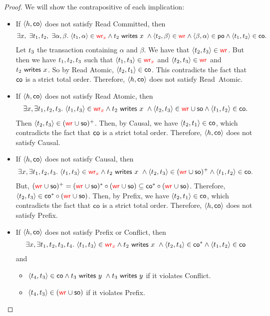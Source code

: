 \begin{proof}
  We will show the contrapositive of each implication:
 \begin{itemize}
   \item If $\tup{\hist, \co}$ does not satisfy \textsf{Read Committed},  then
\begin{align*}
\exists \xvar,\ \exists \tr_1,\tr_2,\ \exists \alpha,\beta.\ \tup{\tr_1,\alpha}\in \wro[\xvar] \land \writeVar{\tr_2}{\xvar}\ \land \tup{\tr_2,\beta}\in\wro \land \tup{\beta,\alpha} \in \po \land \tup{\tr_1,\tr_2}\in\co. 
\end{align*}
Let $\tr_3$ the transaction containing $\alpha$ and $\beta$. We have that $\tup{\tr_2, \tr_3} \in \wro$. But then we have $\tr_1, \tr_2, \tr_3$ such that $\tup{\tr_1, \tr_3} \in \wro[\xvar]$ and $\tup{\tr_2, \tr_3} \in \wro$ and $\writeVar{\tr_2}{\xvar}$. So by \textsf{Read Atomic}, $\tup{\tr_2, \tr_1} \in \co$. This contradicts the fact that $\co$ is a strict total order. Therefore, $\tup{\hist, \co}$ does not satisfy \textsf{Read\ Atomic}.
   \item If $\tup{\hist, \co}$ does not satisfy \textsf{Read Atomic}, then 
 \begin{align*}  
 \exists \xvar, \exists \tr_1,\tr_2,\tr_3.\ \tup{\tr_1,\tr_3}\in \wro[\xvar] \land \writeVar{\tr_2}{\xvar}\ \land \tup{\tr_2,\tr_3}\in\wro\cup\so \land \tup{\tr_1,\tr_2}\in\co.
 \end{align*}
  Then $\tup{\tr_2,\tr_3}\in(\wro\cup\so)^+$. Then, by \textsf{Causal}, we have $\tup{\tr_2, \tr_1} \in \co$, which contradicts the fact that $\co$ is a strict total order. Therefore, $\tup{\hist, \co}$ does not satisfy \textsf{Causal}.
   \item If $\tup{\hist, \co}$ does not satisfy \textsf{Causal}, then
\begin{align*}
\exists \xvar, \exists \tr_1,\tr_2,\tr_3.\ \tup{\tr_1,\tr_3}\in \wro[\xvar] \land \writeVar{\tr_2}{\xvar}\ \land \tup{\tr_2,\tr_3}\in(\wro\cup\so)^+ \land\tup{\tr_1,\tr_2}\in\co.
\end{align*}
   But, $(\wro\cup\so)^+ = (\wro\cup\so)^* \circ (\wro\cup\so) \subseteq \co^* \circ (\wro\cup\so)$. Therefore, $\tup{\tr_2,\tr_3}\in\co^* \circ (\wro\cup\so)$. Then, by \textsf{Prefix}, we have $\tup{\tr_2, \tr_1} \in \co$, which contradicts the fact that $\co$ is a strict total order. Therefore, $\tup{\hist, \co}$ does not satisfy \textsf{Prefix}.
   \item If $\tup{\hist, \co}$ does not satisfy \textsf{Prefix} or \textsf{Conflict}, then 
\begin{align*}
\exists \xvar, \exists \tr_1,\tr_2,\tr_3, \tr_4.\ \tup{\tr_1,\tr_3}\in \wro[\xvar] \land \writeVar{\tr_2}{\xvar}\ \land \tup{\tr_2,\tr_4}\in\co^* \land \tup{\tr_1,\tr_2}\in\co
\end{align*}
and 
       \begin{itemize}
         \item $\tup{\tr_4,\tr_3}\in \co \land \writeVar{\tr_3}{\yvar}\ \land \writeVar{\tr_3}{\yvar}$ if it violates \textsf{Conflict}.
         \item $\tup{\tr_4,\tr_3}\in (\wro \cup \so)$ if it violates \textsf{Prefix}.
       \end{itemize}
       

\end{itemize}
\end{proof}
